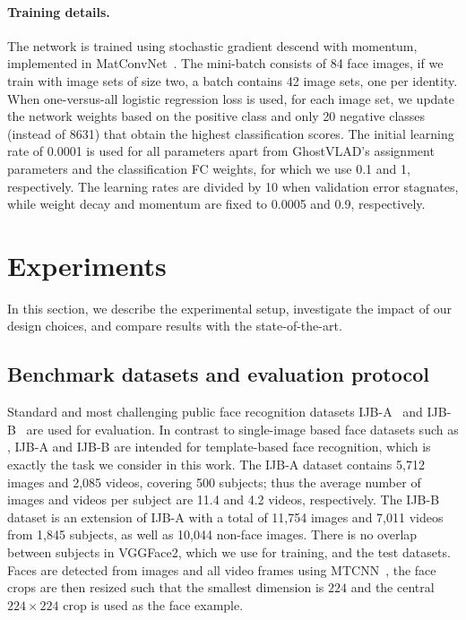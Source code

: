 \documentclass[runningheads]{llncs}
\begin{document}
\paragraph{Training details.}
The network is trained using stochastic gradient 
descend with momentum,
implemented in MatConvNet~\cite{Vedaldi15}.
The mini-batch consists of 84 face images,
\ie if we train with image sets of size two,
a batch contains 42 image sets, one per identity.
When  
one-versus-all logistic regression loss is used,
for each image set, we update the network weights 
based on the positive class and only 20 negative 
classes (instead of 8631) that 
obtain the highest classification scores.
The initial learning rate of 0.0001 is used for all
parameters apart from GhostVLAD's assignment parameters
and the classification FC weights,
for which we use 0.1 and 1, respectively.
The learning rates are divided by 10 when validation error stagnates,
while weight decay and momentum are fixed to 0.0005 and 0.9,
respectively.


\section{Experiments}
\label{sec:exp}
In this section, we describe the experimental setup,
investigate the impact of our design choices,
and compare results with the state-of-the-art.


\subsection{Benchmark datasets and evaluation protocol}
Standard and most challenging public face recognition datasets
IJB-A~\cite{Klare15} and IJB-B~\cite{Whitelam17}
are used for evaluation.
In contrast to single-image based face datasets such as
\cite{Parkhi15,Guo16,Kemelmacher16,Cao18},
IJB-A and IJB-B are intended for template-based face recognition,
which is exactly the task we consider in this work.
The IJB-A dataset contains 5,712 images 
and 2,085 videos, covering 500 subjects; thus the
average number of images and videos per subject
are 11.4 and 4.2 videos, respectively.
The IJB-B dataset is an extension of IJB-A
with a total of 11,754 images and
7,011 videos
from 1,845 subjects, as well as 
10,044 non-face images.
There is no overlap between subjects in VGGFace2, which we use
for training, and the test datasets.
Faces are detected from images and all video frames
using MTCNN~\cite{Zhang16},
the face crops are then resized such that the smallest 
dimension is $224$ and the central $224 \times 224$ crop is
used as the face example.
\end{document}

